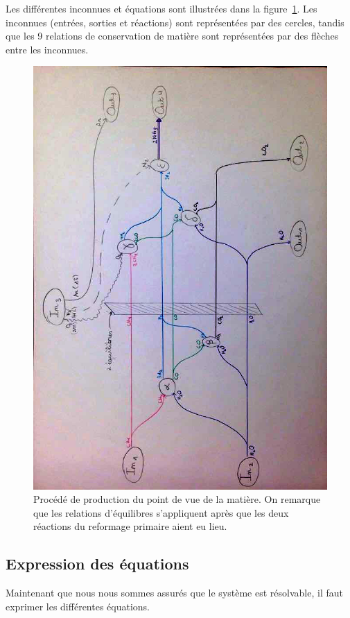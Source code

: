 Les différentes inconnues et équations sont illustrées dans
la figure~\ref{fig:flows-matter}.
Les inconnues (entrées, sorties et réactions) sont représentées par des cercles,
tandis que les 9 relations de conservation de matière
sont représentées par des flèches entre les inconnues.

\begin{figure}
    \centering
    \includegraphics[width=.9\textwidth]{img/flows_matter}
    \caption{
        Procédé de production du point de vue de la matière.
        On remarque que les relations d'équilibres s'appliquent après que les deux
        réactions du reformage primaire aient eu lieu.
    }
    \label{fig:flows-matter}
\end{figure}

\subsection{Expression des équations}

Maintenant que nous nous sommes assurés que le système est résolvable,
il faut exprimer les différentes équations.

